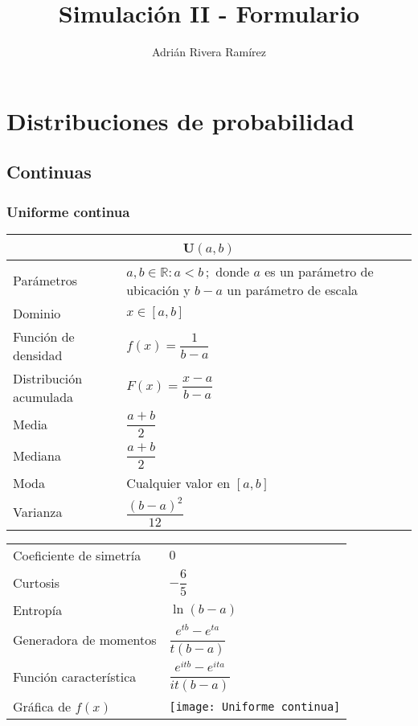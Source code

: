 \documentclass[12pt,a4paper]{article}
\author{Adrián Rivera Ramírez}
\title{Simulación II - Formulario}
\newcommand{\salto}[1][2]{\par\vspace{#1mm}}
\begin{document}
\maketitle
\section{Distribuciones de probabilidad}
\subsection{Continuas}
\salto[5]

\subsubsection*{Uniforme continua}
\begin{center}
	\begin{tabular}{p{}|p{}}
	\multicolumn{2}{c}{U$(a,b)$} \\
	\hline
	Parámetros & $a,b\in\mathbb{R}\colon a<b\,;$ donde $a$ es un parámetro de ubicación y $b-a$ un parámetro de escala \\
	Dominio & $x\in [a,b]$ \\
	Función de densidad & $f(x) = \dfrac{1}{b - a}$ \\
	Distribución acumulada & $F(x) = \dfrac{x - a}{b - a}$ \\
	Media & $\dfrac{a + b}{2}$ \\
	Mediana & $\dfrac{a + b}{2}$ \\
	Moda & Cualquier valor en $[a,b]$ \\
	Varianza & $\dfrac{(b - a)^2}{12}$
	\end{tabular}
	\begin{tabular}{p{}|p{}}
	Coeficiente de simetría & $0$ \\
	Curtosis & $-\dfrac{6}{5}$ \\
	Entropía & $\ln(b - a)$ \\
	Generadora de momentos & $\dfrac{e^{tb} - e^{ta}}{t(b - a)}$ \\
	Función característica & $\dfrac{e^{itb} - e^{ita}}{it(b - a)}$ \\
	\vspace{0.25cm}Gráfica de $f(x)$ & \vspace{0.1mm}\texttt{[image: Uniforme continua]}
	\end{tabular}
\end{center}
\salto[20]
\end{document}
